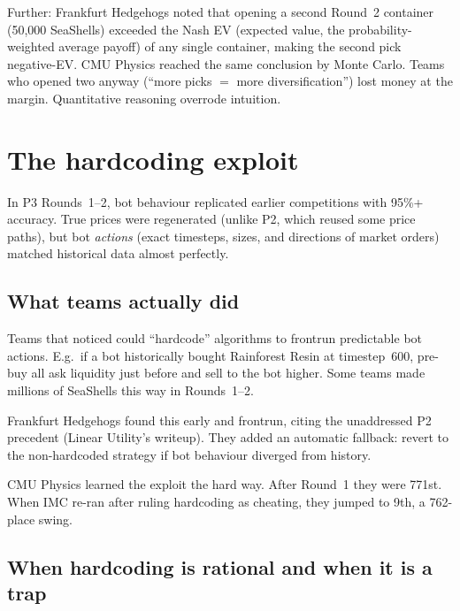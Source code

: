 Further: Frankfurt Hedgehogs noted that opening a second Round~2
container (50{,}000 SeaShells) exceeded the Nash EV (expected
value, the probability-weighted average payoff) of any single
container, making the second pick negative-EV.  CMU Physics
reached the same conclusion by Monte Carlo.  Teams who opened two
anyway (``more picks $=$ more diversification'') lost money at
the margin.  Quantitative reasoning overrode intuition.


\section{The hardcoding exploit}
\label{sec:hardcoding}

In P3 Rounds~1--2, bot behaviour replicated earlier competitions
with 95\%+ accuracy.  True prices were regenerated (unlike P2,
which reused some price paths), but bot \emph{actions} (exact
timesteps, sizes, and directions of market orders) matched
historical data almost perfectly.

\subsection{What teams actually did}

Teams that noticed could ``hardcode'' algorithms to frontrun
predictable bot actions.  E.g.\ if a bot historically bought
Rainforest Resin at timestep~600, pre-buy all ask liquidity just
before and sell to the bot higher.  Some teams made millions of
SeaShells this way in Rounds~1--2.

Frankfurt Hedgehogs found this early and frontrun, citing the
unaddressed P2 precedent (Linear Utility's writeup).  They added
an automatic fallback: revert to the non-hardcoded strategy if
bot behaviour diverged from history.

CMU Physics learned the exploit the hard way.  After Round~1
they were 771st.  When IMC re-ran after ruling hardcoding as
cheating, they jumped to 9th, a 762-place swing.

\subsection{When hardcoding is rational and when it is a trap}

